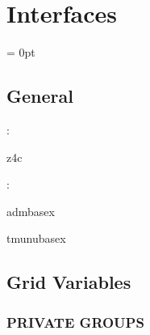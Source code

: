 
\section{Interfaces} 


\parskip = 0pt

\vspace{3mm} \subsection*{General}

: 

z4c
\vspace{2mm}

: 

admbasex

tmunubasex
\vspace{2mm}
\subsection*{Grid Variables}
\vspace{5mm}\subsubsection{PRIVATE GROUPS}

\vspace{5mm}

